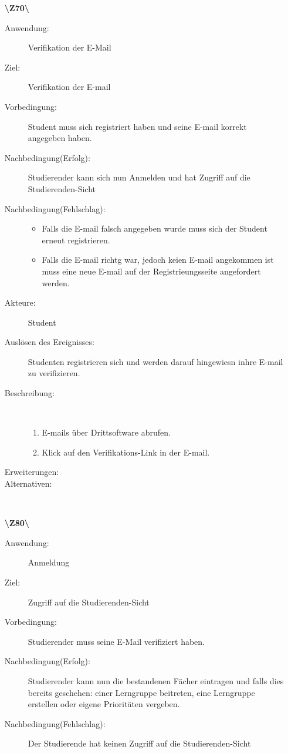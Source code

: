 \documentclass[a4paper]{article}
\begin{document}
\begin{enumerate}
  \item[\textbf{\textbackslash Z70\textbackslash}] \begin{description}
    \item[Anwendung:] Verifikation der E-Mail
    \item[Ziel:] Verifikation der E-mail
    \item[Vorbedingung:] Student muss sich registriert haben und seine E-mail
    korrekt angegeben haben.
    \item[Nachbedingung(Erfolg):] Studierender kann sich nun Anmelden und hat
    Zugriff auf die Studierenden-Sicht
    \item[Nachbedingung(Fehlschlag):] 
    \begin{itemize} 
      \item Falls die E-mail falsch angegeben wurde muss sich der Student erneut
      registrieren.
      \item Falls die E-mail richtg war, jedoch keien E-mail angekommen ist muss
      eine neue E-mail auf der Registrieungsseite angefordert werden.
    \end{itemize}
    \item[Akteure:] Student
    \item[Auslösen des Ereignisses:] Studenten registrieren sich und werden
    darauf hingewiesn inhre E-mail zu verifizieren.
    \item[Beschreibung:]~
    \begin{enumerate}[1.]
      \item E-mails über Drittsoftware abrufen.
      \item Klick auf den Verifikations-Link in der E-mail.
      
    \end{enumerate}
    \item[Erweiterungen:]
    \item[Alternativen:]~
      \end{description}
  \pagebreak
  
  \item[\textbf{\textbackslash Z80\textbackslash}] \begin{description}
    \item[Anwendung:] Anmeldung
    \item[Ziel:] Zugriff auf die Studierenden-Sicht
    \item[Vorbedingung:] Studierender muss seine E-Mail verifiziert haben.
    \item[Nachbedingung(Erfolg):] Studierender kann nun die bestandenen Fächer
    eintragen und falls dies bereits geschehen: einer Lerngruppe beitreten, eine
    Lerngruppe erstellen oder eigene Prioritäten vergeben.
    \item[Nachbedingung(Fehlschlag):] Der Studierende hat keinen Zugriff auf die
    Studierenden-Sicht
    

\end{description}
\end{enumerate}
\end{document}
